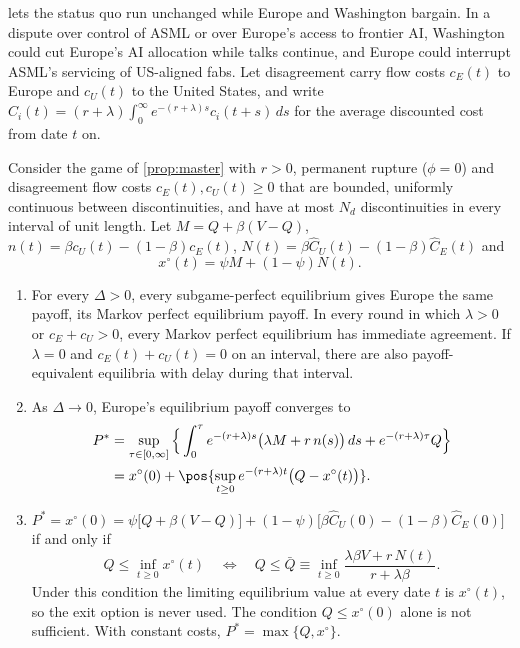  lets the status quo run unchanged while Europe and Washington bargain. In a dispute over control of ASML or over Europe's access to frontier AI, Washington could cut Europe's AI allocation while talks continue, and Europe could interrupt ASML's servicing of US-aligned fabs. Let disagreement carry flow costs $c_E(t)$ to Europe and $c_U(t)$ to the United States, and write $\hat C_i(t)=(r+\lambda)\int_0^\infty e^{-(r+\lambda)s}c_i(t+s)\,ds$ for the average discounted cost from date $t$ on.

\begin{proposition}\label{prop:pain}
Consider the game of \cref{prop:master} with $r>0$, permanent rupture ($\phi=0$) and disagreement flow costs $c_E(t),c_U(t)\ge0$ that are bounded, uniformly continuous between discontinuities, and have at most $N_d$ discontinuities in every interval of unit length. Let $M=Q+\beta(V-Q)$, $n(t)=\beta c_U(t)-(1-\beta)c_E(t)$, $N(t)=\beta\hat C_U(t)-(1-\beta)\hat C_E(t)$ and
\[
x^\circ(t)=\psi M+(1-\psi)N(t).
\]
\begin{enumerate}[label=(\roman*)]
\item For every $\Delta>0$, every subgame-perfect equilibrium gives Europe the same payoff, its Markov perfect equilibrium payoff. In every round in which $\lambda>0$ or $c_E+c_U>0$, every Markov perfect equilibrium has immediate agreement. If $\lambda=0$ and $c_E(t)+c_U(t)=0$ on an interval, there are also payoff-equivalent equilibria with delay during that interval.
\item As $\Delta\to0$, Europe's equilibrium payoff converges to
\begin{align*}
P^*&=\sup_{\tau\in[0,\infty]}\Big\{\int_0^\tau e^{-(r+\lambda)s}\big(\lambda M+r\,n(s)\big)\,ds+e^{-(r+\lambda)\tau}Q\Big\}\\
&=x^\circ(0)+\pos{\sup_{t\ge0}e^{-(r+\lambda)t}\big(Q-x^\circ(t)\big)}.
\end{align*}
\item $P^*=x^\circ(0)=\psi\big[Q+\beta(V-Q)\big]+(1-\psi)\big[\beta\hat C_U(0)-(1-\beta)\hat C_E(0)\big]$ if and only if
\[
Q\le\inf_{t\ge0}x^\circ(t)\quad\Longleftrightarrow\quad Q\le\bar Q\equiv\inf_{t\ge0}\frac{\lambda\beta V+r\,N(t)}{r+\lambda\beta}.
\]
Under this condition the limiting equilibrium value at every date $t$ is $x^\circ(t)$, so the exit option is never used. The condition $Q\le x^\circ(0)$ alone is not sufficient. With constant costs, $P^*=\max\{Q,x^\circ\}$.
\end{enumerate}
\end{proposition}

